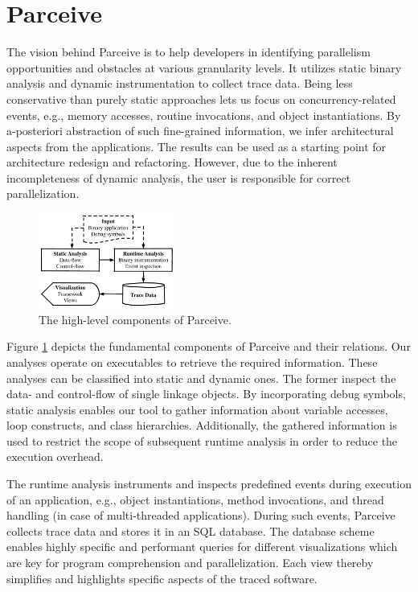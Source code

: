 \section{Parceive}
\label{sec:parceive}
The vision behind Parceive is to help developers in identifying parallelism
opportunities and obstacles at various granularity levels. It utilizes static
binary analysis and dynamic instrumentation to collect trace data. Being less
conservative than purely static approaches lets us focus on concurrency-related
events, e.g., memory accesses, routine invocations, and object instantiations.
By a-posteriori abstraction of such fine-grained information, we infer
architectural aspects from the applications. 
The results can be used as a starting point for architecture redesign and
refactoring. However, due to the inherent incompleteness of dynamic analysis,
the user is responsible for correct parallelization.

\begin{figure}[h!]
	\begin{center}
		\includegraphics[width=0.40\textwidth]{img/parceive}
		\caption{The high-level components of Parceive.}
		\label{fig:parceive_overview}
	\end{center}
\end{figure}

Figure \ref{fig:parceive_overview} depicts the fundamental components of
Parceive and their relations. Our analyses operate on executables to retrieve
the required information. These analyses can be classified into static and
dynamic ones. The former inspect the data- and control-flow of single linkage
objects. By incorporating debug symbols, static analysis enables our tool to
gather information about variable accesses, loop constructs, and class
hierarchies. Additionally, the gathered information is used to restrict the
scope of subsequent runtime analysis in order to reduce the execution overhead.

The runtime analysis instruments and inspects predefined events during
execution of an application, e.g., object instantiations, method invocations,
and thread handling (in case of multi-threaded applications). During such
events, Parceive collects trace data and stores it in an SQL database. The
database scheme enables highly specific and performant queries for different
visualizations which are key for program comprehension and parallelization.
Each view thereby simplifies and highlights specific aspects of the traced
software.